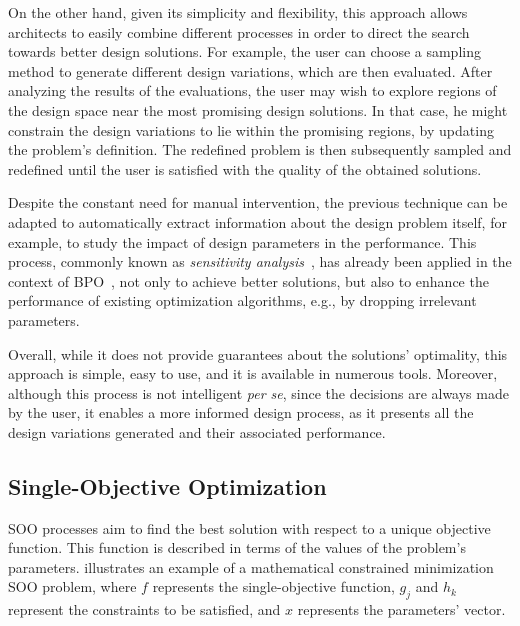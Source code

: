 	On the other hand, given its simplicity and flexibility, this approach allows architects to easily combine different processes in order to direct the search towards better design solutions. For example, the user can choose a sampling method to generate different design variations, which are then evaluated. After analyzing the results of the evaluations, the user may wish to explore regions of the design space near the most promising design solutions. In that case, he might constrain the design variations to lie within the promising regions, by updating the problem’s definition. The redefined problem is then subsequently sampled and redefined until the user is satisfied with the quality of the obtained solutions.
	
	Despite the constant need for manual intervention, the previous technique can be adapted to automatically extract information about the design problem itself, for example, to study the impact of design parameters in the performance. This process, commonly known as \textit{sensitivity analysis}~\cite{Saltelli2007}, has already been applied in the context of \ac{BPO}~\cite{Tian2013}, not only to achieve better solutions, but also to enhance the performance of existing optimization algorithms, e.g., by dropping irrelevant parameters.
	
	Overall, while it does not provide guarantees about the solutions’ optimality, this approach is simple, easy to use, and it is available in numerous tools. Moreover, although this process is not intelligent \textit{per se}, since the decisions are always made by the user, it enables a more informed design process, as it presents all the design variations generated and their associated performance.
	
	\subsection{Single-Objective Optimization}
	\label{ssec:soo}
	
	\ac{SOO} processes aim to find the best solution with respect to a unique objective function. This function is described in terms of the values of the problem's parameters.  illustrates an example of a mathematical constrained minimization \ac{SOO} problem, where $f$ represents the single-objective function, $g_j$ and $h_k$ represent the constraints to be satisfied, and $x$ represents the parameters' vector.
	
